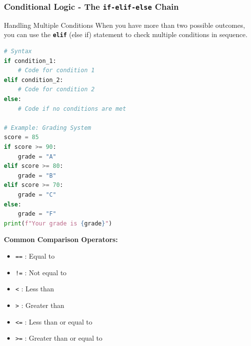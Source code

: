 \documentclass{beamer}
\begin{document}
\begin{frame}[fragile]
    \frametitle{Conditional Logic - The \texttt{if-elif-else} Chain}
    
    \begin{block}{Handling Multiple Conditions}
        When you have more than two possible outcomes, you can use the \textbf{\texttt{elif}} (else if) statement to check multiple conditions in sequence.
        \begin{lstlisting}[language=Python]
# Syntax
if condition_1:
    # Code for condition 1
elif condition_2:
    # Code for condition 2
else:
    # Code if no conditions are met

# Example: Grading System
score = 85
if score >= 90:
    grade = "A"
elif score >= 80:
    grade = "B"
elif score >= 70:
    grade = "C"
else:
    grade = "F"
print(f"Your grade is {grade}")
        \end{lstlisting}
    \end{block}
    
    \textbf{Common Comparison Operators:}
    \begin{itemize}
        \item \texttt{==} : Equal to
        \item \texttt{!=} : Not equal to
        \item \texttt{<} : Less than
        \item \texttt{>} : Greater than
        \item \texttt{<=} : Less than or equal to
        \item \texttt{>=} : Greater than or equal to
    \end{itemize}
    
\end{frame}
\end{document}
